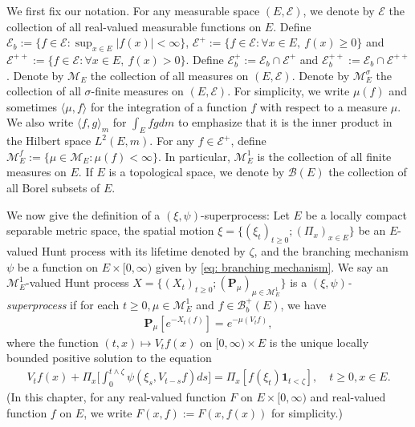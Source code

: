 \documentclass[UTF8]{pkuthss}
\theoremstyle{plain}
\theoremstyle{definition}
\numberwithin{equation}{section}
\begin{document}
	We first fix our notation.
	For any measurable space $(E,\mathscr E)$, we denote by $\mathscr E$ the collection of all real-valued measurable functions on $E$.
	Define $\mathscr E_b :=\{f \in \mathscr E: \sup_{x\in E}|f(x)|<\infty \}$, $\mathscr E^+ :=\{f\in \mathscr E: \forall x\in E,~f(x)\geq 0\}$ and $\mathscr E^{++} :=\{f\in \mathscr E: \forall x\in E,~f(x)> 0\}$.
	Define $\mathscr E^+_b := \mathscr E_b \cap \mathscr E^+$ and $\mathscr E^{++}_b:= \mathscr E_b \cap \mathscr E^{++}$.
	Denote by $\mathcal M_E$ the collection of all measures on $(E,\mathscr E)$.
	Denote by $\mathcal M^\sigma_E$ the collection of all  $\sigma$-finite measures on $(E,\mathscr E)$.
	For simplicity, we write $\mu(f)$ and sometimes $\langle \mu, f\rangle$ for the integration of a function $f$ with respect to a measure $\mu$.
    We also write $\langle f, g\rangle_m$ for $\int_E fg dm$ to emphasize that it is the inner product in the Hilbert space $L^2(E, m)$.
	For any $f \in \mathscr E^+$, define $\mathcal M^f_E:= \{\mu \in \mathcal M_E: \mu(f) < \infty\}$.
	In particular, $\mathcal M^1_E$ is the collection of all  finite measures on $E$.
	If $E$ is a topological space, we denote by $\mathscr B(E)$ the collection of all  Borel subsets of $E$.
	
	We now give the definition of a $(\xi, \psi)$-superprocess:
	Let $E$ be a locally compact separable metric space, the spatial motion $\xi=\{(\xi_t)_{t\geq 0};(\Pi_x)_{x\in E}\}$ be an $E$-valued Hunt process with its lifetime denoted by $\zeta$, and the branching mechanism $\psi$ be a function on $E\times[0,\infty)$ given by \eqref{eq: branching mechanism}.
	We say an $\mathcal M^1_E$-valued Hunt process $X=\{(X_t)_{t\geq 0}; (\mathbf P_\mu)_{\mu \in \mathcal M^1_E}\}$ is a \emph{$(\xi,\psi)$-superprocess} if for each $t\geq 0, \mu \in \mathcal M_E^1$ and  $f\in \mathscr B^+_b(E)$, we have
\begin{align}
	\mathbf P_\mu [e^{-X_t(f)}] = e^{-\mu(V_tf)},
\end{align}
	where the function $(t,x) \mapsto V_tf(x)$ on $[0,\infty) \times E$ is the unique locally bounded positive solution to the equation
\begin{align}\label{eq: chap 5 FKPP_in_definition}
	V_t f(x) + \Pi_x \Big[  \int_0^{t\wedge \zeta} \psi (\xi_s,V_{t-s} f) ds \Big]
	= \Pi_x [ f(\xi_t)\mathbf 1_{t<\zeta} ],
	\quad t \geq 0, x \in E.
\end{align}
	(In this chapter, for any real-valued function $F$ on $E\times [0,\infty)$ and real-valued function $f$ on $E$, we write $F(x,f):= F(x,f(x))$ for simplicity.)
\end{document}
